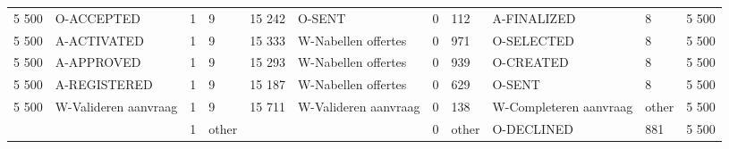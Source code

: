 \begin{tabular}{llllllllllr}
5 500 & O-ACCEPTED & 1 & 9 & 15 242 & O-SENT & 0 & 112 & A-FINALIZED & 8 & 5 500 \\
5 500 & A-ACTIVATED & 1 & 9 & 15 333 & W-Nabellen offertes & 0 & 971 & O-SELECTED & 8 & 5 500 \\
5 500 & A-APPROVED & 1 & 9 & 15 293 & W-Nabellen offertes & 0 & 939 & O-CREATED & 8 & 5 500 \\
5 500 & A-REGISTERED & 1 & 9 & 15 187 & W-Nabellen offertes & 0 & 629 & O-SENT & 8 & 5 500 \\
5 500 & W-Valideren aanvraag & 1 & 9 & 15 711 & W-Valideren aanvraag & 0 & 138 & W-Completeren aanvraag & other & 5 500 \\
 &  & 1 & other &  &  & 0 & other & O-DECLINED & 881 & 5 500 \\
\bottomrule
\end{tabular}
